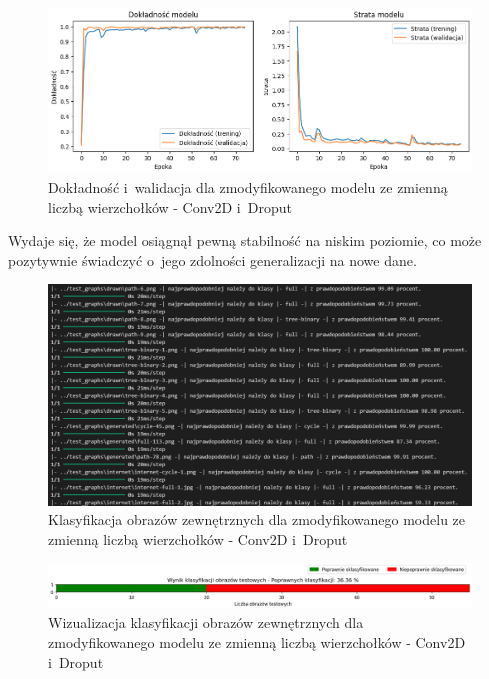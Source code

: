 \begin{figure}[ht]
	\centering
	\includegraphics[width=15.5cm]{resources/tests/images/v4/multiple_edges_1_img.png}
	\caption{Dokładność i~walidacja dla zmodyfikowanego modelu ze zmienną liczbą wierzchołków - Conv2D i~Droput}
	\label{Fig:tests-var-1a}
\end{figure}
\FloatBarrier

Wydaje się, że model osiągnął pewną stabilność na niskim poziomie, co może pozytywnie świadczyć o~jego zdolności generalizacji na nowe dane.

\begin{figure}[ht]
	\centering
	\includegraphics[width=15.5cm]{resources/tests/images/v4/multiple_edges_1_txt.png}
	\caption{Klasyfikacja obrazów zewnętrznych dla zmodyfikowanego modelu ze zmienną liczbą wierzchołków - Conv2D i~Droput}
	\label{Fig:tests-var-1b}
\end{figure}
\FloatBarrier

\begin{figure}[ht]
	\centering
	\includegraphics[width=15.5cm]{resources/tests/images/v4/multiple_edges_1_bar.png}
	\caption{Wizualizacja klasyfikacji obrazów zewnętrznych dla zmodyfikowanego modelu ze zmienną liczbą wierzchołków - Conv2D i~Droput}
	\label{Fig:tests-var-1c}
\end{figure}
\FloatBarrier

